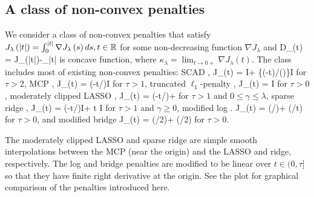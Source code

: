 \subsection{A class of non-convex penalties}
We consider a class of non-convex penalties that satisfy $J_\lambda\left(|t|\right) = \int_0^{|t|} \nabla J_\lambda \left(s\right)ds, t\in\mathbb{R}$
for some non-decreasing function $\nabla J_\lambda$ and
\beqn\label{pen:decomp}
    D_\lambda\left(t\right) = J_\lambda\left(|t|\right)-\kappa_\lambda |t|
\eeqn
 is concave function, where $\kappa_\lambda  = \lim_{t\to0+}\nabla J_\lambda\left(t\right)$.
The class includes most of existing non-convex penalties:
SCAD \citep{fan2001variable},
\beqns
    \nabla J_{\lambda}\left(t\right) = \lambda I + \left\{\left(\tau\lambda-t\right)/\left(\right)\right\}I
\eeqns
for $\tau>2$, MCP \citep{zhang2010nearly},
\beqns
     \nabla J_{\lambda}\left(t\right) = \left(\lambda-t/\tau\right)I
\eeqns
for $\tau>1$, truncated $\ell_1$-penalty \citep{shen2013constrained},
\beqns
    \nabla J_{\lambda}\left(t\right) = \lambda I
\eeqns
for $\tau>0$, moderately clipped LASSO \citep{kwon2015moderately},
\beqns
    \nabla J_{\lambda}\left(t\right) = \left(\lambda-t/\tau\right) + \gamma {}
\eeqns
for $\tau>1$ and $0\leq\gamma\leq \lambda$,
sparse ridge \citep{choi2013sparse},
\beqns
    \nabla J_{\lambda}\left(t\right) = \left(\lambda-t/\tau\right)I + \gamma t I
\eeqns
for $\tau>1$ and $\gamma\geq0$,
modified log \citep{zou2005regularization}.
\beqns
    \nabla J_{\lambda}\left(t\right) = \left(\lambda/\tau\right) + \left(\lambda/t\right)
\eeqns
for $\tau>0$, and modified bridge \citep{huang2008asymptotic}
\beqns
    \nabla J_{\lambda}\left(t\right) = \left(\lambda/2\sqrt{\tau}\right) + (\lambda/2)
\eeqns
for $\tau>0$.

The moderately clipped LASSO and sparse ridge are simple smooth interpolations between the MCP (near the origin) and the LASSO and ridge, respectively.
The log and bridge penalties are modified to be linear over $t\in(0,\tau]$ so that they have finite right derivative at the origin.
See the plot for graphical comparison of the penalties introduced here.

